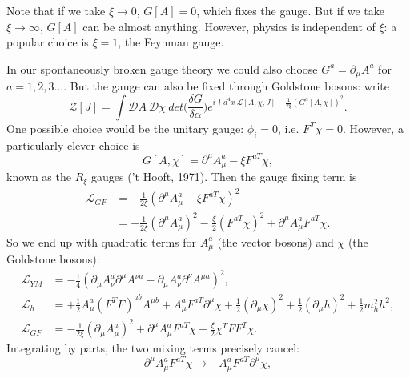 Note that if we take $\xi \to 0$, $G[A]=0$, which fixes the gauge. But if we take $\xi \to \infty$, $G[A]$ can be almost anything. However, physics is independent of $\xi$: a popular choice is $\xi =1$, the Feynman gauge.

In our spontaneously broken gauge theory we could also choose $G^a = \partial_\mu A^a$ for $a=1,2,3...$. But the gauge can also be fixed through Goldstone bosons: write
\begin{equation}
\mathcal{Z}[J]= \int \mathcal{D}A\ \mathcal{D}\chi\ det\bigg(\frac{\delta G}{\delta \alpha} \bigg) e^{i\int d^4x\ \mathcal{L}[A, \chi, J] - \frac{1}{2\xi}(G^a[A, \chi])^2}.
\end{equation}
One possible choice would be the unitary gauge: $\phi_i = 0$, i.e. $F^T\chi = 0$. However, a particularly clever choice is
\begin{equation}
G[A, \chi] = \partial^\mu A_\mu^a - \xi F^{a T}\chi,
\end{equation}
known as the $R_\xi$ gauges ('t Hooft, 1971). Then the gauge fixing term is
\begin{equation}
\begin{split}
\mathcal{L}_{GF} &= - \frac{1}{2\xi}(\partial^\mu A_\mu^a - \xi F^{a T}\chi)^2 \\
&= - \frac{1}{2 \xi}(\partial^\mu A_\mu^a)^2 - \frac{\xi}{2}(F^{a T}\chi)^2 + \partial^\mu A_\mu^a F^{a T}\chi.
\end{split}
\end{equation}
So we end up with quadratic terms for $A_\mu^a$ (the vector bosons) and $\chi$ (the Goldstone bosons):
\begin{equation}
\begin{split}
\mathcal{L}_{YM} &= -\frac{1}{4}(\partial_\mu A_\nu^a \partial^\mu A^{\nu a} - \partial_\mu A_\nu^a \partial^\nu A^{\mu a})^2, \\
\mathcal{L}_h &= + \frac{1}{2}A_\mu^a(F^TF)^{ab}A^{\mu b} + A_\mu^a F^{a T}\partial^\mu \chi + \frac{1}{2}(\partial_\mu \chi)^2 + \frac{1}{2}(\partial_\mu h)^2 + \frac{1}{2}m_h^2 h^2, \\
\mathcal{L}_{GF} &= - \frac{1}{2\xi}(\partial_\mu A_\mu^a)^2 + \partial^\mu A_\mu^a F^{a T} \chi - \frac{\xi}{2} \chi^T F F^T \chi.
\end{split}
\end{equation}
Integrating by parts, the two mixing terms precisely cancel:
\begin{equation}
\partial^\mu A_\mu^a F^{a T}\chi \to - A_\mu^a F^{a T} \partial^\mu \chi,
\end{equation}
